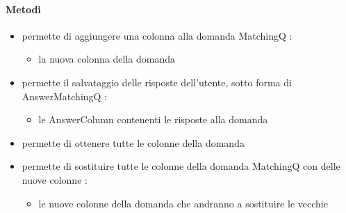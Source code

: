 \paragraph{Metodi}
\begin{itemize}
\item {}
\newline
permette di aggiungere una colonna alla domanda MatchingQ
\newline
{} :
\begin{itemize}
\item {}
\newline
la nuova colonna della domanda
\end{itemize}
\item {}
\newline
permette il salvataggio delle risposte dell'utente, sotto forma di AnswerMatchingQ
\newline
{} :
\begin{itemize}
\item {}
\newline
le AnswerColumn contenenti le risposte alla domanda
\end{itemize}
\item {}
\newline
permette di ottenere tutte le colonne della domanda
\newline
\item {}
\newline
permette di sostituire tutte le colonne della domanda MatchingQ con delle nuove colonne
\newline
{} :
\begin{itemize}
\item {}
\newline
le nuove colonne della domanda che andranno a sostituire le vecchie
\end{itemize}
\end{itemize}
